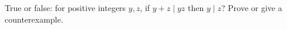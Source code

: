 True or false: for positive integers $y,z$, if $y+z\mid yz$ then $y\mid z$? Prove or give a counterexample.
